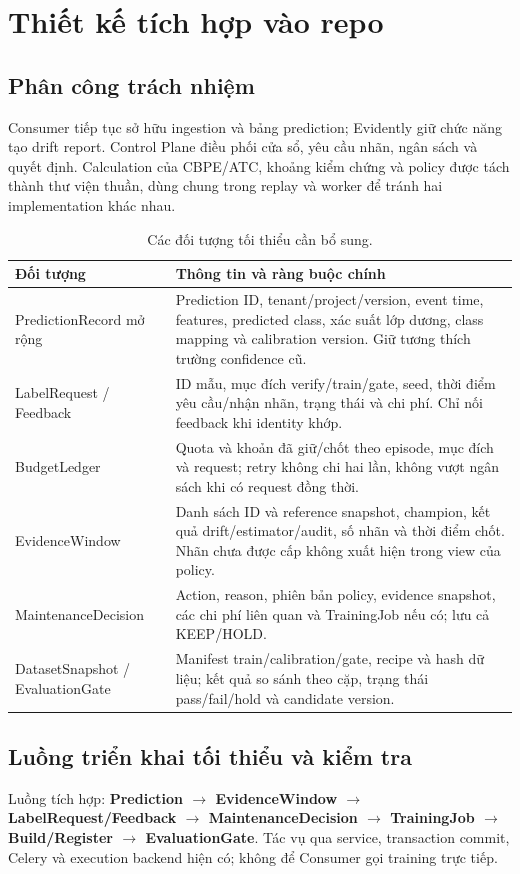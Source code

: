\section{Thiết kế tích hợp vào repo}
\subsection{Phân công trách nhiệm}
Consumer tiếp tục sở hữu ingestion và bảng prediction; Evidently giữ chức năng tạo drift report. Control Plane điều phối cửa sổ, yêu cầu nhãn, ngân sách và quyết định. Calculation của CBPE/ATC, khoảng kiểm chứng và policy được tách thành thư viện thuần, dùng chung trong replay và worker để tránh hai implementation khác nhau.

\begin{table}[ht]
\centering
\caption{Các đối tượng tối thiểu cần bổ sung.}\label{tab:contracts}
\begin{tabularx}{\linewidth}{@{}L{3.6cm} Y@{}}
\toprule\textbf{Đối tượng} & \textbf{Thông tin và ràng buộc chính} \\
\midrule
PredictionRecord mở rộng & Prediction ID, tenant/project/version, event time, features, predicted class, xác suất lớp dương, class mapping và calibration version. Giữ tương thích trường confidence cũ. \\
LabelRequest / Feedback & ID mẫu, mục đích verify/train/gate, seed, thời điểm yêu cầu/nhận nhãn, trạng thái và chi phí. Chỉ nối feedback khi identity khớp. \\
BudgetLedger & Quota và khoản đã giữ/chốt theo episode, mục đích và request; retry không chi hai lần, không vượt ngân sách khi có request đồng thời. \\
EvidenceWindow & Danh sách ID và reference snapshot, champion, kết quả drift/estimator/audit, số nhãn và thời điểm chốt. Nhãn chưa được cấp không xuất hiện trong view của policy. \\
MaintenanceDecision & Action, reason, phiên bản policy, evidence snapshot, các chi phí liên quan và TrainingJob nếu có; lưu cả KEEP/HOLD. \\
DatasetSnapshot / EvaluationGate & Manifest train/calibration/gate, recipe và hash dữ liệu; kết quả so sánh theo cặp, trạng thái pass/fail/hold và candidate version. \\
\bottomrule
\end{tabularx}
\end{table}

\subsection{Luồng triển khai tối thiểu và kiểm tra}
Luồng tích hợp: \textbf{Prediction $\rightarrow$ EvidenceWindow $\rightarrow$ LabelRequest/Feedback $\rightarrow$ MaintenanceDecision $\rightarrow$ TrainingJob $\rightarrow$ Build/Register $\rightarrow$ EvaluationGate}. Tác vụ qua service, transaction commit, Celery và execution backend hiện có; không để Consumer gọi training trực tiếp.

